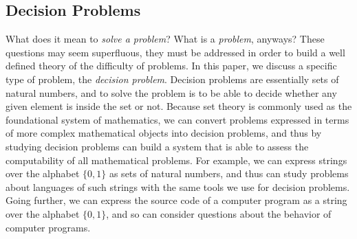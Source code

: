 \documentclass[psamsfonts]{amsart}
\theoremstyle{definition}
\theoremstyle{remark}
\numberwithin{equation}{section}
\begin{document}
\subsection{Decision Problems}
What does it mean to \emph{solve a problem}? What is a \emph{problem}, anyways?
These questions may seem superfluous, they must be addressed in order to build a
well defined theory of the difficulty of problems. In this paper, we discuss a
specific type of problem, the \emph{decision problem}. Decision problems are
essentially sets of natural numbers, and to solve the problem is to be able to
decide whether any given element is inside the set or not. Because set theory is
commonly used as the foundational system of mathematics, we can convert problems
expressed in terms of more complex mathematical objects into decision problems,
and thus by studying decision problems can build a system that is able to assess
the computability of all mathematical problems. For example, we can express
strings over the alphabet $\{0,1\}$ as sets of natural numbers, and thus can
study problems about languages of such strings with the same tools we use for
decision problems. Going further, we can express the source code of a computer
program as a string over the alphabet $\{0,1\}$, and so can consider questions
about the behavior of computer programs.
\end{document}
